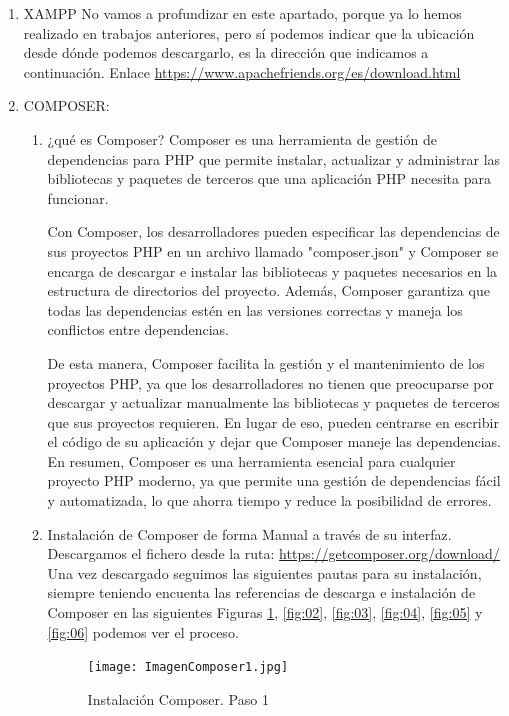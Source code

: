 \documentclass{article}
\begin{document}
\begin{enumerate}
    \item     XAMPP 
No vamos a profundizar en este apartado, porque ya lo hemos realizado en trabajos anteriores, pero sí podemos indicar que la ubicación desde dónde podemos descargarlo, es la dirección que indicamos a continuación. Enlace \url{https://www.apachefriends.org/es/download.html}

    \item     COMPOSER: 
        \begin{enumerate}
            \item ¿qué es Composer?
Composer es una herramienta de gestión de dependencias para PHP que permite instalar, actualizar y administrar las bibliotecas y paquetes de terceros que una aplicación PHP necesita para funcionar.

Con Composer, los desarrolladores pueden especificar las dependencias de sus proyectos PHP en un archivo llamado "composer.json" y Composer se encarga de descargar e instalar las bibliotecas y paquetes necesarios en la estructura de directorios del proyecto. Además, Composer garantiza que todas las dependencias estén en las versiones correctas y maneja los conflictos entre dependencias.

De esta manera, Composer facilita la gestión y el mantenimiento de los proyectos PHP, ya que los desarrolladores no tienen que preocuparse por descargar y actualizar manualmente las bibliotecas y paquetes de terceros que sus proyectos requieren. En lugar de eso, pueden centrarse en escribir el código de su aplicación y dejar que Composer maneje las dependencias.
En resumen, Composer es una herramienta esencial para cualquier proyecto PHP moderno, ya que permite una gestión de dependencias fácil y automatizada, lo que ahorra tiempo y reduce la posibilidad de errores.
            \item Instalación de Composer de forma Manual a través de su interfaz.
Descargamos el fichero desde la ruta: \url{https://getcomposer.org/download/}
Una vez descargado seguimos las siguientes pautas para su instalación, siempre teniendo encuenta las referencias de descarga \cite{descargaComposer} e instalación \cite{instalaComposer} de Composer en las siguientes Figuras \ref{fig:01}, \ref{fig:02}, \ref{fig:03}, \ref{fig:04}, \ref{fig:05} y \ref{fig:06} podemos ver el proceso.


\begin{figure}[!]
\centering
\texttt{[image: ImagenComposer1.jpg]}
\caption{\label{fig:01} Instalación Composer. Paso 1}
\end{figure}


\end{enumerate}
\end{enumerate}
\end{document}
